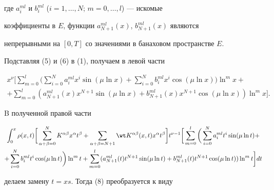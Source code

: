 где $a^{ml}_i$ и $b^{ml}_i$ ($i=1,\dotsc,N$; $m=0,\dotsc,l$) --- искомые 


коэффициенты в $E$, функции $a^{ml}_{N+1}(x)$, $b^{ml}_{N+1}(x)$ являются 


непрерывными на $[0,T]$ со значениями в банаховом пространстве $E$. 


 


Подставляя (5) и (6) в (1), получаем в левой части 


\begin{multline} 


x^\nu\bigg[\sum^l_{m=0}\bigg(\sum^N_{i=0}a^{ml}_i x^i\sin(\mu\ln x)+ 


\sum^N_{i=0}b^{ml}_i x^i\cos(\mu\ln x)\bigg)\ln^m x+\\ 


% 


+\sum^l_{m=0}(a^{ml}_{N+1}(x)x^{N+1}\sin(\mu\ln x)+ 


b^{ml}_{N+1}(x)x^{N+1}\cos(\mu\ln x))\ln^m x\bigg]. 


\end{multline} 


 


B полученной правой части 


\begin{multline} 


\int^x_0\rho(x,t)\bigg[\sum^N_{\alpha+\beta=0} 


K^{\alpha\beta}x^\alpha t^\beta+\sum_{\alpha+\beta=N+1} 


\wt K{}^{\alpha\beta}(x,t)x^\alpha t^\beta\bigg]t^{\nu-1} 


\bigg[\sum^l_{m=0}\bigg(\sum^N_{i=0}a^{ml}_i t^i\sin(\mu\ln t)+\\ 


% 


+\sum^N_{i=0}b^{ml}_i t^i\cos(\mu\ln t)\bigg)\ln^m t+ 


\sum^l_{m=0}(a^{ml}_{N+1}(t)t^{N+1}\sin(\mu\ln t)+ 


b^{ml}_{N+1}(t)t^{N+1}\cos(\mu\ln t))\ln^m t\bigg]dt 


\end{multline} 


делаем замену $t=xs$. Тогда (8) преобразуется к виду 


